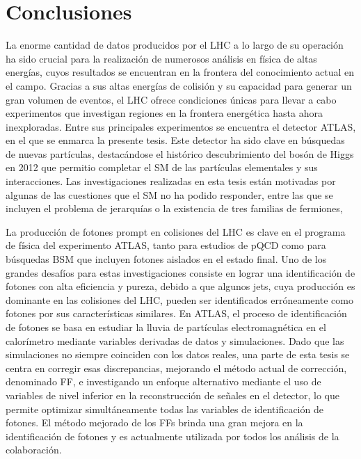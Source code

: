 \chapter*{Conclusiones}




La enorme cantidad de datos producidos por el \ac{LHC} a lo largo de su operación ha sido crucial para la realización de numerosos análisis en física de altas energías, cuyos resultados se encuentran en la frontera del conocimiento actual en el campo. Gracias a sus altas energías de colisión y su capacidad para generar un gran volumen de eventos, el \ac{LHC} ofrece condiciones únicas para llevar a cabo experimentos que investigan regiones en la frontera energética hasta ahora inexploradas. Entre sus principales experimentos se encuentra el detector \ac{ATLAS}, en el que se enmarca la presente tesis. Este detector ha sido clave en búsquedas de nuevas partículas, destacándose el histórico descubrimiento del bosón de Higgs en 2012 que permitio completar el \ac{SM} de las partículas elementales y sus interacciones. Las investigaciones realizadas en esta tesis están motivadas por algunas de las cuestiones que el \ac{SM} no ha podido responder, entre las que se incluyen el problema de jerarquías o la existencia de tres familias de fermiones, 

La producción de fotones prompt en colisiones \pp del \ac{LHC} es clave en el programa de física del experimento \ac{ATLAS}, tanto para estudios de \ac{pQCD} como para búsquedas \ac{BSM} que incluyen fotones aislados en el estado final. Uno de los grandes desafíos para estas investigaciones consiste en lograr una identificación de fotones con alta eficiencia y pureza, debido a que algunos jets, cuya  producción es dominante en las colisiones del \ac{LHC}, pueden ser identificados erróneamente como fotones por sus características similares. En \ac{ATLAS}, el proceso de identificación de fotones se basa en estudiar la lluvia de partículas electromagnética en el calorímetro mediante variables derivadas de datos y simulaciones. Dado que las simulaciones no siempre coinciden con los datos reales, una parte de esta tesis se centra en corregir esas discrepancias, mejorando el método actual de corrección, denominado \acf{FF}, e investigando un enfoque alternativo mediante el uso de variables de nivel inferior en la reconstrucción de señales en el detector, lo que permite optimizar simultáneamente todas las variables de identificación de fotones. El método mejorado de los \acp{FF} brinda una gran mejora en la identificación de fotones y es actualmente utilizada por todos los análisis de la colaboración.

